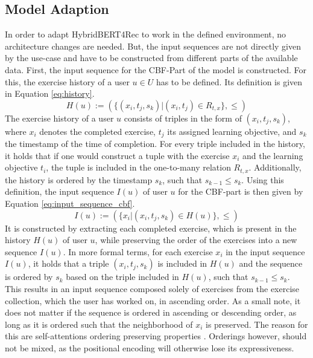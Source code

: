 \documentclass{Academic}
\begin{document}
        \subsection{Model Adaption}
        In order to adapt HybridBERT4Rec to work in the defined environment, no architecture changes are needed. But, the input sequences are not directly given by the use-case and have to be constructed from different parts of the available data. First, the input sequence for the CBF-Part of the model is constructed. For this, the exercise history of a user $u \in U$ has to be defined. Its definition is given in Equation \ref{eq:history}.
        \begin{equation}\label{eq:history}
            H(u) := (\{(x_i, t_j, s_k)| (x_i, t_j) \in R_{t,x}\}, \leq)
        \end{equation}
        The exercise history of a user $u$ consists of triples in the form of $(x_i, t_j, s_k)$, where $x_i$ denotes the completed exercise, $t_j$ its assigned learning objective, and $s_k$ the timestamp of the time of completion. For every triple included in the history, it holds that if one would construct a tuple with the exercise $x_i$ and the learning objective $t_i$, the tuple is included in the one-to-many relation $R_{t,x}$. Additionally, the history is ordered by the timestamp $s_k$, such that $s_{k-1} \leq s_k$. Using this definition, the input sequence $I(u)$ of user $u$ for the CBF-part is then given by Equation \ref{eq:input_sequence_cbf}.
        \begin{equation}\label{eq:input_sequence_cbf}
            I(u) := (\{x_i|(x_i, t_j, s_k) \in H(u)\}, \leq)
        \end{equation}
        It is constructed by extracting each completed exercise, which is present in the history $H(u)$ of user $u$, while preserving the order of the exercises into a new sequence $I(u)$. In more formal terms, for each exercise $x_i$ in the input sequence $I(u)$, it holds that a triple $(x_i, t_j, s_k)$ is included in $H(u)$ and the sequence is ordered by $s_k$ based on the triple included in $H(u)$, such that $s_{k-1} \leq s_k$. This results in an input sequence composed solely of exercises from the exercise collection, which the user has worked on, in ascending order. As a small note, it does not matter if the sequence is ordered in ascending or descending order, as long as it is ordered such that the neighborhood of $x_i$ is preserved. The reason for this are self-attentions ordering preserving properties \cite{vaswaniAttentionAllYou2017}. Orderings however, should not be mixed, as the positional encoding will otherwise lose its expressiveness.\\
\end{document}
